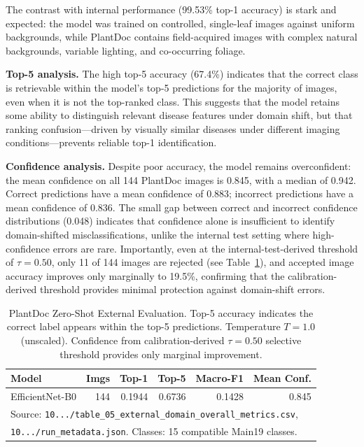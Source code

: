 \documentclass[conference]{IEEEtran}
\begin{document}
The contrast with internal performance (99.53\% top-1 accuracy) is stark and
expected: the model was trained on controlled, single-leaf images against
uniform backgrounds, while PlantDoc contains field-acquired images with complex
natural backgrounds, variable lighting, and co-occurring foliage.

\textbf{Top-5 analysis.}
The high top-5 accuracy (67.4\%) indicates that the correct class is retrievable
within the model's top-5 predictions for the majority of images, even when it
is not the top-ranked class. This suggests that the model retains some ability
to distinguish relevant disease features under domain shift, but that ranking
confusion---driven by visually similar diseases under different imaging
conditions---prevents reliable top-1 identification.

\textbf{Confidence analysis.}
Despite poor accuracy, the model remains overconfident: the mean confidence on
all 144 PlantDoc images is 0.845, with a median of 0.942. Correct predictions
have a mean confidence of 0.883; incorrect predictions have a mean confidence
of 0.836. The small gap between correct and incorrect confidence distributions
(0.048) indicates that confidence alone is insufficient to identify domain-shifted
misclassifications, unlike the internal test setting where high-confidence errors
are rare. Importantly, even at the internal-test-derived threshold of $\tau=0.50$,
only 11 of 144 images are rejected (see Table~\ref{tab:plantdoc_selective}),
and accepted image accuracy improves only marginally to 19.5\%, confirming that
the calibration-derived threshold provides minimal protection against domain-shift
errors.

\begin{table}[t]
\caption{PlantDoc Zero-Shot External Evaluation.
Top-5 accuracy indicates the correct label appears within the top-5 predictions.
Temperature $T=1.0$ (unscaled). Confidence from calibration-derived
$\tau=0.50$ selective threshold provides only marginal improvement.}
\label{tab:plantdoc_selective}
\centering
\setlength{\tabcolsep}{4pt}
\begin{tabular}{lrrrrr}
\toprule
\textbf{Model} & \textbf{Imgs} & \textbf{Top-1} & \textbf{Top-5} & \textbf{Macro-F1} & \textbf{Mean Conf.} \\
\midrule
EfficientNet-B0 & 144 & 0.1944 & 0.6736 & 0.1428 & 0.845 \\
\bottomrule
\multicolumn{6}{l}{\small Source: \texttt{10.../table\_05\_external\_domain\_overall\_metrics.csv},} \\
\multicolumn{6}{l}{\small \texttt{10.../run\_metadata.json}. Classes: 15 compatible Main19 classes.} \\
\end{tabular}
\end{table}
\end{document}
